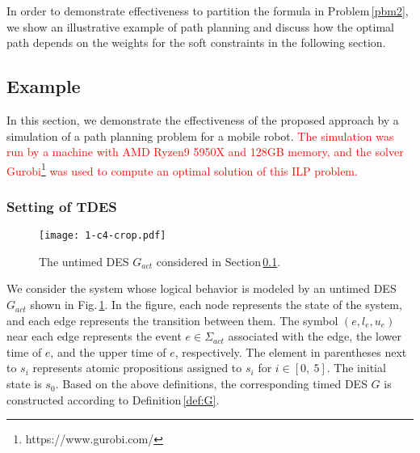 \documentclass[journal,twoside,web]{IEEEtran}
\newcommand{\rdef}[1]{Definition\,\ref{#1}}
\newcommand{\rpbm}[1]{Problem\,\ref{#1}}
\newcommand{\rsec}[1]{Section\,\ref{#1}}
\newcommand{\rfig}[1]{Fig.\,\ref{#1}}
\newcommand{\red}[1]{\textcolor{red}{#1}}
\begin{document}
%
In order to demonstrate effectiveness to partition the formula in \rpbm{pbm2}, 
we show an illustrative example of path planning and discuss how the optimal path depends on the weights for the soft constraints in the following section.
%

%
\subsection{Example}\label{sec:sim1}
%
In this section, we demonstrate the effectiveness of the proposed approach by a simulation of a path planning problem for a mobile robot.
\red{The simulation was run by a machine with AMD Ryzen9 5950X and 128GB memory, and the solver Gurobi\footnote{https://www.gurobi.com/} was used to compute an optimal solution of this ILP problem.}
%
\subsubsection{Setting of TDES}
\label{settingDES}
%
%
\begin{figure}
\centering 
\texttt{[image: 1-c4-crop.pdf]}
\caption{The untimed DES $G_{act}$ considered in \rsec{sec:sim1}.}
\label{sim1}
\end{figure}
%
We consider the system whose logical behavior is modeled by an untimed DES $G_{act}$ shown in \rfig{sim1}.
In the figure, each node represents the state of the system, and each edge represents the transition between them. 
The symbol $(e,l_e,u_e)$ near each edge represents the event  $e\in\Sigma_{act}$ associated with the edge, the lower time of $e$, and the upper time of $e$, respectively. The element in parentheses next to $s_i$ represents atomic propositions assigned to $s_i$ for $i\in[0,~5]$.
The initial state is $s_0$.
%
Based on the above definitions, the corresponding timed DES $G$ is constructed according to \rdef{def:G}. 
%
\end{document}
